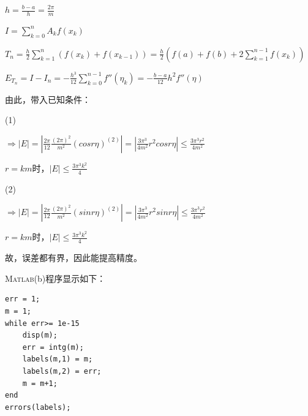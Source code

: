 \documentclass[12pt,a4paper,UTF8]{ctexart}
\begin{document}
\begin{enumerate}
\qquad $h = \frac{b - a}{h} = \frac{2\pi}{m}$

\qquad $I = \sum_{k = 0}^{n} A_kf(x_k)$

\qquad $T_n = \frac{h}{2} \sum_{k = 1}^{n} (f(x_k)+f(x_{k-1})) = \frac{h}{2}(f(a) + f(b) + 2\sum_{k = 1}^{n-1}f(x_k))$

\qquad $E_{T_n} = I - I_n = -\frac{h^3}{12}\sum_{k = 0}^{n-1}f''(\eta_k) = -\frac{b-a}{12}h^2f''(\eta)$



由此，带入已知条件：

(1)

\quad $\Rightarrow |E| = |\frac{2\pi}{12}\frac{(2\pi)^2}{m^2}(cos r\eta)^{(2)}| = |\frac{3\pi^3}{4m^2} r^2 cosr\eta| \leq \frac{3\pi^3 r^2}{4m^2}$

\quad $r = km$时，$|E| \leq \frac{3\pi^3 k^2}{4}$


(2)

\quad $\Rightarrow |E| = |\frac{2\pi}{12}\frac{(2\pi)^2}{m^2}(sin r\eta)^{(2)}| = |\frac{3\pi^3}{4m^2} r^2 sinr\eta| \leq \frac{3\pi^3 r^2}{4m^2}$

\quad $r = km$时，$|E| \leq \frac{3\pi^3 k^2}{4}$

故，误差都有界，因此能提高精度。

\textsc{Matlab}(b)程序显示如下：
\begin{lstlisting}[frame=single]
err = 1;
m = 1;
while err>= 1e-15
    disp(m);
    err = intg(m);
    labels(m,1) = m;
    labels(m,2) = err;
    m = m+1;
end
errors(labels);


\end{lstlisting}
\end{enumerate}
\end{document}
